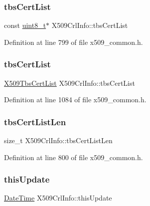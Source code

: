 \subsubsection{\texorpdfstring{tbs\+Cert\+List}{tbsCertList}\hspace{0.1cm}{\footnotesize\ttfamily [1/2]}}
{\footnotesize\ttfamily const \hyperlink{stdint_8h_aba7bc1797add20fe3efdf37ced1182c5}{uint8\+\_\+t}$\ast$ X509\+Crl\+Info\+::tbs\+Cert\+List}



Definition at line 799 of file x509\+\_\+common.\+h.

\mbox{\label{structX509CrlInfo_af3c54fa0df425db38876f2a3e7637d55}} 
\subsubsection{\texorpdfstring{tbs\+Cert\+List}{tbsCertList}\hspace{0.1cm}{\footnotesize\ttfamily [2/2]}}
{\footnotesize\ttfamily \hyperlink{structX509TbsCertList}{X509\+Tbs\+Cert\+List} X509\+Crl\+Info\+::tbs\+Cert\+List}



Definition at line 1084 of file x509\+\_\+common.\+h.

\mbox{\label{structX509CrlInfo_a37f5b6aa82254acb88a5d87d316ca406}} 
\subsubsection{\texorpdfstring{tbs\+Cert\+List\+Len}{tbsCertListLen}}
{\footnotesize\ttfamily size\+\_\+t X509\+Crl\+Info\+::tbs\+Cert\+List\+Len}



Definition at line 800 of file x509\+\_\+common.\+h.

\mbox{\label{structX509CrlInfo_a8aac6bf90e1c3b7f06670a445efa2777}} 
\subsubsection{\texorpdfstring{this\+Update}{thisUpdate}}
{\footnotesize\ttfamily \hyperlink{structDateTime}{Date\+Time} X509\+Crl\+Info\+::this\+Update}



